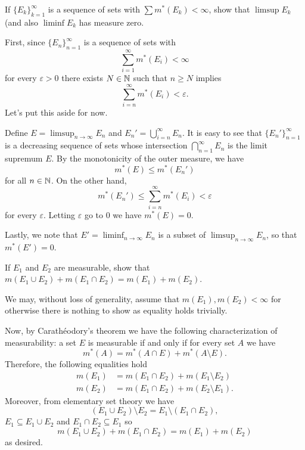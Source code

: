 \begin{problem}
  If \({\{E_k\}}_{k=1}^\infty\) is a sequence of sets with
  \(\sum m^*(E_k)<\infty\), show that \(\limsup E_k\) (and also
  \(\liminf E_k\) has measure zero.
\end{problem}
\begin{solution}
  First, since \({\{E_n\}}_{n=1}^\infty\) is a sequence of sets with
  \[
    \sum_{i=1}^\infty m^*(E_i)<\infty
  \]
  for every \(\varepsilon>0\) there exists \(N\in\mathbb{N}\) such that
  \(n\geq N\) implies
  \[
    \sum_{i=n}^\infty m^*(E_i)<\varepsilon.
  \]
  Let's put this aside for now.

  Define \(E=\limsup_{n\to\infty} E_n\) and
  \(E_n'=\bigcup_{i=n}^\infty E_n\). It is easy to see that
  \({\{E_n'\}}_{n=1}^\infty\) is a decreasing sequence of sets whose
  intersection \(\bigcap_{n=1}^\infty E_n\) is the limit supremum \(E\). By
  the monotonicity of the outer measure, we have
  \[
    m^*(E)\leq m^*(E_n')
  \]
  for all \(n\in\mathbb{N}\). On the other hand,
  \[
    m^*(E_n')\leq \sum_{i=n}^\infty m^*(E_i)<\varepsilon
  \]
  for every \(\varepsilon\). Letting \(\varepsilon\) go to \(0\) we have
  \(m^*(E)=0\).

  Lastly, we note that \(E'=\liminf_{n\to\infty} E_n\) is a subset of
  \(\limsup_{n\to\infty} E_n\), so that \(m^*(E')=0\).
\end{solution}

\begin{problem}
  If \(E_1\) and \(E_2\) are measurable, show that
  \(m(E_1\cup E_2)+m(E_1\cap E_2)=m(E_1)+m(E_2)\).
\end{problem}
\begin{solution}
  We may, without loss of generality, assume that \(m(E_1),m(E_2)<\infty\)
  for otherwise there is nothing to show as equality holds trivially.

  Now, by Carathéodory's theorem we have the following characterization of
  measurability: a set \(E\) is measurable if and only if for every set
  \(A\) we have
  \[
    m^*(A)=m^*(A\cap E)+m^*(A\setminus E).
  \]
  Therefore, the following equalities hold
  \begin{align*}
    m(E_1)&=m(E_1\cap E_2)+m(E_1\setminus E_2)\\
    m(E_2)&=m(E_1\cap E_2)+m(E_2\setminus E_1).
  \end{align*}
  Moreover, from elementary set theory we have
  \[
    (E_1\cup E_2)\setminus E_2=E_1\setminus (E_1\cap E_2),
  \]
  \(E_1\subseteq E_1\cup E_2\) and \(E_1\cap E_2\subseteq E_1\) so
  \[
    m(E_1\cup E_2)+m(E_1\cap E_2)=m(E_1)+m(E_2)
  \]
  as desired.
\end{solution}


